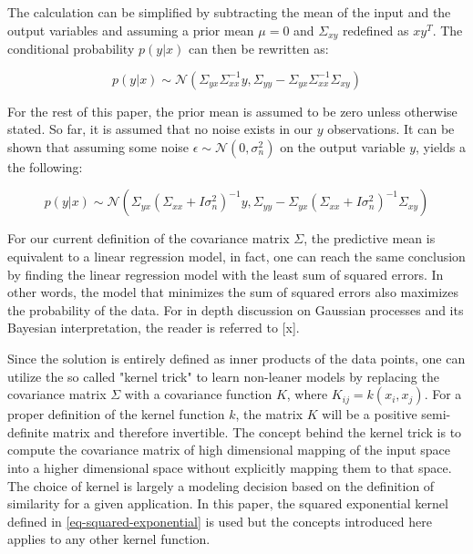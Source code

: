 \documentclass[a4paper,12pt]{article}
\begin{document}
The calculation can be simplified by subtracting the mean of the input and the output variables and assuming a prior mean $\mu=0$ and $\Sigma_{xy}$ redefined as $xy^{T}$. The conditional probability $p(y|x)$ can then be rewritten as:

\begin{equation}
\label{eq-conditional-zero-mean}
p(y|x) \sim  \mathcal{N} \left ( \Sigma_{yx}\Sigma_{xx}^{-1}y, \Sigma_{yy}-\Sigma_{yx}\Sigma_{xx}^{-1}\Sigma_{xy}\right )
\end{equation}

For the rest of this paper, the prior mean is assumed to be zero unless otherwise stated. So far, it is assumed that no noise exists in our $y$ observations. It can be shown that assuming some noise $\epsilon \sim \mathcal{N}\left(0,\sigma_{n}^{2}\right)$ on the output variable $y$, yields a the following:

\begin{equation}
\label{eq-mean-variance-noise}
p(y|x) \sim  \mathcal{N} \left ( \Sigma_{yx}\left(\Sigma_{xx}+I\sigma_{n}^{2}\right)^{-1}y, \Sigma_{yy}-\Sigma_{yx}\left(\Sigma_{xx}+I\sigma_{n}^{2}\right)^{-1}\Sigma_{xy}\right )
\end{equation}

For our current definition of the covariance matrix $\Sigma$, the predictive mean is equivalent to a linear regression model, in fact, one can reach the same conclusion by finding the linear regression model with the least sum of squared errors. In other words, the model that minimizes the sum of squared errors also maximizes the probability of the data. For in depth discussion on Gaussian processes and its Bayesian interpretation, the reader is referred to [x].

Since the solution is entirely defined as inner products of the data points, one can utilize the so called "kernel trick" to learn non-leaner models by replacing the covariance matrix $\Sigma$ with a covariance function $K$, where $K_{ij} = k(x_{i},x_{j})$. For a proper definition of the kernel function $k$, the matrix $K$ will be a positive semi-definite matrix and therefore invertible. The concept behind the kernel trick is to compute the covariance matrix of high dimensional mapping of the input space into a higher dimensional space without explicitly mapping them to that space. The choice of kernel is largely a modeling decision based on the definition of similarity for a given application. In this paper, the squared exponential kernel defined in \eqref{eq-squared-exponential} is used but the concepts introduced here applies to any other kernel function.
\end{document}
